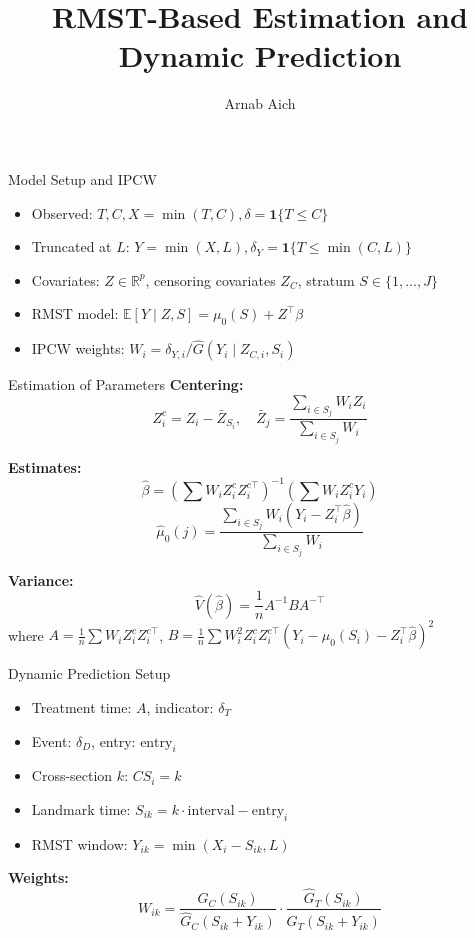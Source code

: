 \documentclass{beamer}
\title{RMST-Based Estimation and Dynamic Prediction}
\author{Arnab Aich}
\institute{UTHSC}
\begin{document}
\frame{\titlepage}

\begin{frame}{Model Setup and IPCW}
\begin{itemize}
  \item Observed: \( T, C, X = \min(T, C), \delta = \mathbf{1}\{T \leq C\} \)
  \item Truncated at \( L \): \( Y = \min(X, L), \delta_Y = \mathbf{1}\{T \leq \min(C, L)\} \)
  \item Covariates: \( Z \in \mathbb{R}^p \), censoring covariates \( Z_C \), stratum \( S \in \{1, \dots, J\} \)
  \item RMST model: \( \mathbb{E}[Y \mid Z, S] = \mu_0(S) + Z^\top \beta \)
  \item IPCW weights: \( W_i = \delta_{Y,i} / \hat{G}(Y_i \mid Z_{C,i}, S_i) \)
\end{itemize}
\end{frame}

\begin{frame}{Estimation of Parameters}
\textbf{Centering:}
\[
Z_i^c = Z_i - \bar{Z}_{S_i}, \quad \bar{Z}_j = \frac{\sum_{i \in S_j} W_i Z_i}{\sum_{i \in S_j} W_i}
\]

\textbf{Estimates:}
\[
\hat{\beta} = \left( \sum W_i Z_i^c Z_i^{c\top} \right)^{-1} \left( \sum W_i Z_i^c Y_i \right)
\]
\[
\hat{\mu}_0(j) = \frac{ \sum_{i \in S_j} W_i (Y_i - Z_i^\top \hat{\beta}) }{ \sum_{i \in S_j} W_i }
\]

\textbf{Variance:}
\[
\hat{V}(\hat{\beta}) = \frac{1}{n} A^{-1} B A^{-\top}
\]
where \( A = \frac{1}{n} \sum W_i Z_i^c Z_i^{c\top} \), 
\( B = \frac{1}{n} \sum W_i^2 Z_i^c Z_i^{c\top} (Y_i - \hat{\mu}_0(S_i) - Z_i^\top \hat{\beta})^2 \)
\end{frame}

\begin{frame}{Dynamic Prediction Setup}
\begin{itemize}
  \item Treatment time: \( A \), indicator: \( \delta_T \)
  \item Event: \( \delta_D \), entry: \( \text{entry}_i \)
  \item Cross-section \( k \): \( CS_i = k \)
  \item Landmark time: \( S_{ik} = k \cdot \text{interval} - \text{entry}_i \)
  \item RMST window: \( Y_{ik} = \min(X_i - S_{ik}, L) \)
\end{itemize}

\textbf{Weights:}
\[
W_{ik} = \frac{\hat{G}_C(S_{ik})}{\hat{G}_C(S_{ik} + Y_{ik})} \cdot 
\frac{\hat{G}_T(S_{ik})}{\hat{G}_T(S_{ik} + Y_{ik})}
\]
\end{frame}
\end{document}
